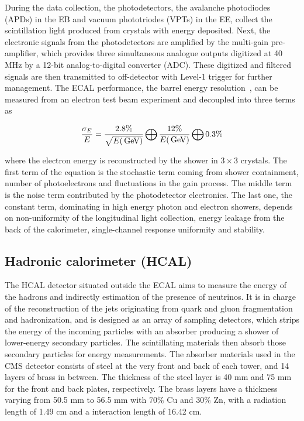 During the data collection, the photodetectors, the avalanche photodiodes (APDs) in the EB and vacuum phototriodes (VPTs) in the EE, collect the scintillation light produced from crystals with energy deposited. 
Next, the electronic signals from the photodetectors are amplified by the multi-gain pre-amplifier, which provides three simultaneous analogue outputs digitized at 40 MHz by a 12-bit analog-to-digital converter (ADC).
These digitized and filtered signals are then transmitted to off-detector with Level-1 trigger for further management.
The ECAL performance, the barrel energy resolution~\cite{Adzic:2007mi}, can be measured from an electron test beam experiment and decoupled into three terms as
\begin{linenomath}\begin{equation}\label{eq:cms_ecal}
    \frac{\sigma_E}{E} = \frac{2.8\%}{\sqrt{E(\,\text{Ge\hspace{-.08em}V})}} \bigoplus \frac{12\%}{E(\,\text{Ge\hspace{-.08em}V})} \bigoplus 0.3\%
\end{equation}\end{linenomath}
where the electron energy is reconstructed by the shower in $3\times 3$ crystals.
The first term of the equation is the stochastic term coming from shower containment, number of photoelectrons and fluctuations in the gain process.
The middle term is the noise term contributed by the photodetector electronics.
The last one, the constant term, dominating in high energy photon and electron showers, depends on non-uniformity of the longitudinal light collection, energy leakage from the back of the calorimeter, single-channel response uniformity and stability.

\subsection{Hadronic calorimeter (HCAL)}
The HCAL detector situated outside the ECAL aims to measure the energy of the hadrons and indirectly estimation of the presence of neutrinos.
It is in charge of the reconstruction of the jets originating from quark and gluon fragmentation and hadronization, and is designed as an array of sampling detectors, which strips the energy of the incoming particles with an absorber producing a shower of lower-energy secondary particles.
The scintillating materials then absorb those secondary particles for energy measurements.
The absorber materials used in the CMS detector consists of steel at the very front and back of each tower, and 14 layers of brass in between.
The thickness of the steel layer is 40 mm and 75 mm for the front and back plates, respectively.
The brass layers have a thickness varying from 50.5 mm to 56.5 mm with $70\%$ Cu and $30\%$ Zn, with a radiation length of 1.49 cm and a interaction length of 16.42 cm.

